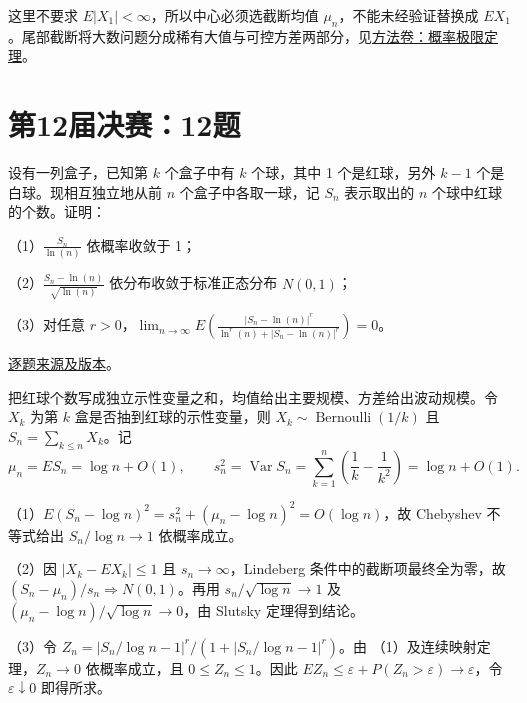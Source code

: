 \begin{remark}[方法与条件]

这里不要求 $E|X_1|<\infty$，所以中心必须选截断均值 $\mu_n$，不能未经验证替换成 $EX_1$。尾部截断将大数问题分成稀有大值与可控方差两部分，见\hyperref[app:probability-limit]{方法卷：概率极限定理}。

\end{remark}

\section{第12届决赛：12题}\label{pr:fin12-high:12}

\begin{example}[公开题解转录]\label{q:fin12-high:12}

设有一列盒子，已知第 $k$ 个盒子中有 $k$ 个球，其中 1 个是红球，另外 $k-1$ 个是白球。现相互独立地从前 $n$ 个盒子中各取一球，记 $S_n$ 表示取出的 $n$ 个球中红球的个数。证明：

（1）$\frac{S_n}{\ln(n)}$ 依概率收敛于 1；

（2）$\frac{S_n - \ln(n)}{\sqrt{\ln(n)}}$ 依分布收敛于标准正态分布 $N(0,1)$；

（3）对任意 $r > 0$，$\lim_{n \to \infty} E\left(\frac{\left|S_n - \ln(n)\right|^r}{\ln^r(n) + \left|S_n - \ln(n)\right|^r}\right) = 0$。

\end{example}

\href{https://github.com/lzxcr/cmc-mathematics/blob/64916fa1fdbc3e444a652eca204d5669058ee321/src/problems/finals/12/14.md}{逐题来源及版本}。

\begin{solve}

把红球个数写成独立示性变量之和，均值给出主要规模、方差给出波动规模。令 $X_k$ 为第 $k$ 盒是否抽到红球的示性变量，则 $X_k\sim\operatorname{Bernoulli}(1/k)$ 且 $S_n=\sum_{k\leq n}X_k$。记
\[
\mu_n=ES_n=\log n+O(1),\qquad
s_n^2=\operatorname{Var}S_n=\sum_{k=1}^n\left(\frac1k-\frac1{k^2}\right)=\log n+O(1).
\]

（1）$E(S_n-\log n)^2=s_n^2+(\mu_n-\log n)^2=O(\log n)$，故 Chebyshev 不等式给出 $S_n/\log n\to1$ 依概率成立。

（2）因 $|X_k-EX_k|\leq1$ 且 $s_n\to\infty$，Lindeberg 条件中的截断项最终全为零，故 $(S_n-\mu_n)/s_n\Rightarrow N(0,1)$。再用 $s_n/\sqrt{\log n}\to1$ 及 $(\mu_n-\log n)/\sqrt{\log n}\to0$，由 Slutsky 定理得到结论。

（3）令 $Z_n=|S_n/\log n-1|^r/(1+|S_n/\log n-1|^r)$。由 （1）及连续映射定理，$Z_n\to0$ 依概率成立，且 $0\leq Z_n\leq1$。因此 $EZ_n\leq\varepsilon+P(Z_n>\varepsilon)\to\varepsilon$，令 $\varepsilon\downarrow0$ 即得所求。

\end{solve}

